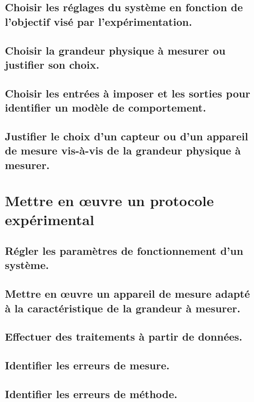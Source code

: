 \documentclass[10pt,fleqn]{book}
\begin{document}
\subsection{Choisir les réglages du système en fonction de l'objectif visé par l'expérimentation.} 

\subsection{Choisir la grandeur physique à mesurer ou justifier son choix.} 

\subsection{Choisir les entrées à imposer et les sorties pour identifier un modèle de comportement.} 

\subsection{Justifier le choix d’un capteur ou d’un appareil de mesure vis-à-vis de la grandeur physique à mesurer.} 

\section{Mettre en œuvre un protocole expérimental} 

\subsection{Régler les paramètres de fonctionnement d'un système.} 

\subsection{Mettre en œuvre un appareil de mesure adapté à la caractéristique de la grandeur à mesurer.} 

\subsection{Effectuer des traitements à partir de données. } 

\subsection{Identifier les erreurs de mesure.} 

\subsection{Identifier les erreurs de méthode.} 
\end{document}
